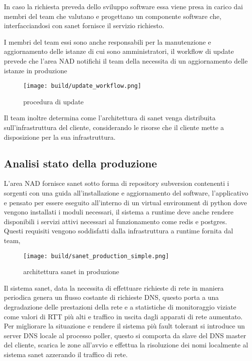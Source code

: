 In caso la richiesta preveda dello sviluppo software essa viene presa in carico dai membri del team che valutano e progettano un componente software che, interfacciandosi con sanet fornisce il servizio richiesto.

I membri del team essi sono anche responsabili per la manutenzione e aggiornamento delle istanze di cui sono amministratori, il workflow di update prevede che l'area NAD notifichi il team della necessita di un aggiornamento delle istanze in produzione


\begin{figure}[H]
    \centering
    \texttt{[image: build/update\_workflow.png]}
    \caption{procedura di update}
    \label{fig:enter-label}
\end{figure}

Il team inoltre determina come l'architettura di sanet venga distribuita sull'infrastruttura del cliente, considerando le risorse che il cliente mette a disposizione per la sua infrastruttura.

\subsection{Analisi stato della produzione}

L'area NAD fornisce sanet sotto forma di repository subversion contenenti i sorgenti con una guida all'installazione e aggiornamento del software, l'applicativo e pensato per essere eseguito all'interno di un virtual environment di python dove vengono installati i moduli necessari, il sistema a runtime deve anche rendere disponibili i servizi attivi necessari al funzionamento come redis e postgres. Questi requisiti vengono soddisfatti dalla infrastruttura a runtime fornita dal team,

\begin{figure}[H]
    \centering
    \texttt{[image: build/sanet\_production\_simple.png]}
    \caption{architettura sanet in produzione}
    \label{fig:enter-label}
\end{figure}

Il sistema sanet, data la necessita di effettuare richieste di rete in maniera periodica genera un flusso costante di richieste DNS, questo porta a una degradazione delle prestazioni della rete e a statistiche di monitoraggio viziate come valori di RTT più alti e traffico in uscita dagli apparati di rete aumentato. Per migliorare la situazione e rendere il sistema più fault tolerant si introduce un server DNS locale al processo poller, questo si comporta da slave del DNS master del cliente, scarica le zone all'avvio e effettua la risoluzione dei nomi localmente al sistema sanet azzerando il traffico di rete.


